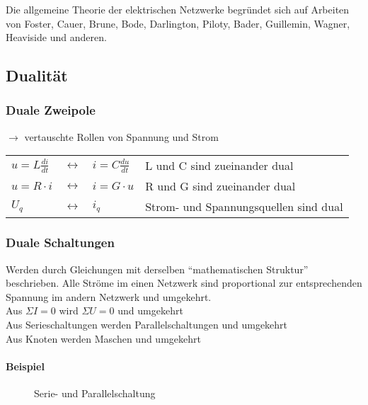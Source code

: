 Die allgemeine Theorie der elektrischen Netzwerke begründet sich auf Arbeiten von Foster,
Cauer, Brune, Bode, Darlington, Piloty, Bader, Guillemin, Wagner, Heaviside und anderen.

\subsection{Dualität}
\subsubsection{Duale Zweipole}
$\rightarrow$ vertauschte Rollen von Spannung und Strom\\
\begin{tabular}{llll}
$u=L\frac{di}{dt}$&$ \leftrightarrow$&$ i=C\frac{du}{dt}$
& L und C sind zueinander dual\\
$u=R\cdot i $&$ \leftrightarrow $&$ i=G\cdot u$ &
R und G sind zueinander dual\\
$U_q $&$ \leftrightarrow $&$ i_q $
& Strom- und Spannungsquellen sind dual\\
\end{tabular}

\subsubsection{Duale Schaltungen}
Werden durch Gleichungen mit derselben "`mathematischen Struktur"' beschrieben.
Alle Ströme im einen Netzwerk sind proportional zur entsprechenden Spannung im
andern Netzwerk und umgekehrt.\\
Aus $\Sigma I=0$ wird $\Sigma U=0$ und umgekehrt\\
Aus Serieschaltungen werden Parallelschaltungen und umgekehrt\\
Aus Knoten werden Maschen und umgekehrt\\
\paragraph{Beispiel}
\begin{figure}[!ht]
\centering
\subfloat[Serieschaltung]{
	
	\label{fig:elNetzwerke:Serieschaltung}
}
\qquad
\qquad
\subfloat[Parallelschaltung]{
	
	\label{fig:elNetzwerke:Parallelschaltung} 
}
\caption[Serie- und Parallelschaltung]{Serie- und Parallelschaltung}
\label{fig:elNetzwerke}
\end{figure}

